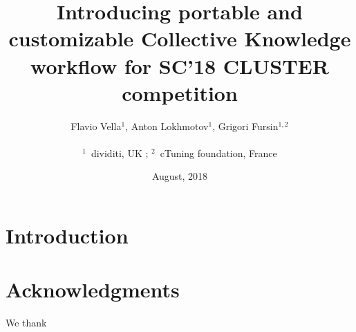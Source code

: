 \documentclass[10pt,letterpaper,twocolumn]{article}
\begin{document}
\title{Introducing portable and customizable Collective Knowledge workflow for SC'18 CLUSTER competition}

\author{Flavio Vella$^{1}$, Anton Lokhmotov$^{1}$, Grigori Fursin$^{1,2}$ \\
\\
$^1$~dividiti, UK ; $^2$~cTuning foundation, France\\
}

\date{August, 2018}

\maketitle

\begin{abstract}
 
\end{abstract}

\section{Introduction}


\section{Acknowledgments}

We thank 



\end{document}
